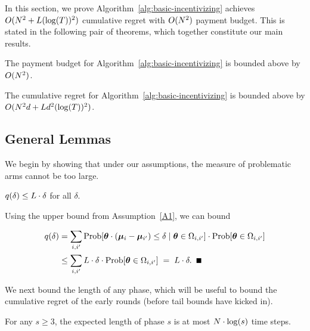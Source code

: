 In this section, we prove Algorithm~\ref{alg:basic-incentivizing} achieves $O(N^2+L(\log(T))^2)$ cumulative regret with $O(N^2)$ payment budget.  This is stated in the following pair of theorems, which together constitute our main results.

\begin{theorem}
The payment budget for Algorithm~\ref{alg:basic-incentivizing} is bounded above by $O(N^2)$. 
\label{rst:budget}
\end{theorem}


\begin{theorem}
The cumulative regret for Algorithm~\ref{alg:basic-incentivizing}
is bounded above by $O(N^2 d + L d^2(\log(T))^2)$.
\label{rst:regret}
\end{theorem}

\subsection{General Lemmas}

We begin by showing that under our assumptions, the measure of
problematic arms cannot be too large.

\begin{lemma} \label{lem:sdelta}
$q(\delta) \leq L \cdot \delta$ for all $\delta$.
\end{lemma}

\begin{emptyproof}
Using the upper bound from Assumption~\ref{A1}, we can bound

\begin{align*}
\AlmostTied{\delta}
& = \sum_{i,i'} \ProbC{\AgV \cdot (\ArmV{i} - \ArmV{i'}) \leq \delta}%
    {\AgV \in \FirstTwo{i}{i'}}
  \cdot \Prob{\AgV \in \FirstTwo{i}{i'}}\\
& \leq \sum_{i,i'} \TieDensity \cdot \delta
    \cdot \Prob{\AgV \in \FirstTwo{i}{i'}}
\; = \; \TieDensity \cdot \delta. \QED
\end{align*}
\end{emptyproof}

We next bound the length of any phase, which will be useful to bound
the cumulative regret of the early rounds
(before tail bounds have kicked in).

\begin{lemma} \label{lem:phase-length}
For any $s\geq 3$, the expected length of phase $s$ is at most
$N \cdot \log(s)$ time steps.
\end{lemma}

